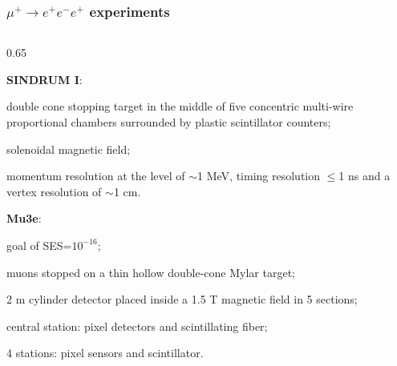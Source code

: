 \documentclass{beamer}
\begin{document}
    \begin{frame}
        \frametitle{$\mu^+  \rightarrow e^+ e^- e^+$ experiments}
        \vspace{-3mm}
\begin{columns}
 \begin{column}{0.65\framewidth}
 \setlength{\leftmargini}{1.1em}

    \begin{itemize}
        {\small     \item \textbf{SINDRUM I}:  }
        \begin{itemize}
            {\small \item  double cone stopping target in the 
            middle of five concentric multi-wire proportional chambers 
            surrounded by plastic scintillator counters;
            \item solenoidal magnetic field;
            \item momentum resolution at the level of $\sim$1 MeV, 
            timing resolution $\leq$1 ns and a vertex resolution of $\sim$1 cm.
            }
        \end{itemize}
   {\small     \item \textbf{Mu3e}: 
   }
   \begin{itemize}
    {\small \item  goal of SES=$10^{-16}$;
    \item muons stopped on a thin hollow double-cone Mylar target;
    \item 2 m cylinder detector placed inside a 1.5 T magnetic field in 5 sections;
    \item central station: pixel detectors and scintillating fiber;
    \item 4 stations: pixel
    sensors and scintillator.
    }
\end{itemize}



\end{itemize}
\end{column}
\end{columns}
\end{frame}
\end{document}
